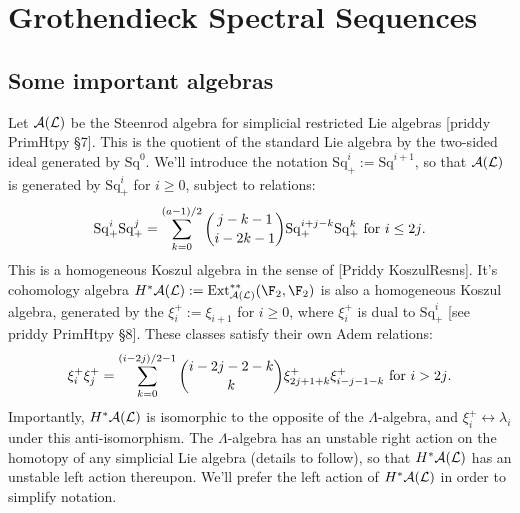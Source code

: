 \documentclass[11pt]{article}
\newcommand{\LambdaOp}{\xi^{+}}
\newcommand{\SqShift}{\Sq_{+}}
\newcommand{\Sq}{\mathrm{Sq}}
\newcommand{\LieSteen}{\calA(\calL)}
\begin{document}
\section*{Grothendieck Spectral Sequences}
\subsection*{Some important algebras}
Let  $\LieSteen$ be the Steenrod algebra for simplicial restricted Lie algebras [priddy PrimHtpy \S7]. This is the quotient of the standard Lie algebra by the two-sided ideal generated by $\Sq^0$. We'll introduce the notation $\SqShift^i:=\Sq^{i+1}$, so that $\LieSteen$ is generated by $\SqShift^i$ for $i\geq0$, subject to relations:
\[\SqShift^i\SqShift^j=\sum_{k=0}^{(a-1)/2}{j-k-1\choose i-2k-1}\SqShift^{i+j-k}\SqShift^k\textup{\ for $i\leq2j$.}\]
This is a homogeneous Koszul algebra in the sense of [Priddy KoszulResns]. It's cohomology algebra $H^*\LieSteen:=\Ext_{\LieSteen}^{**}(\F_2,\F_2)$ is also a homogeneous Koszul algebra, generated by the $\LambdaOp_i:=\xi_{i+1}$ for $i\geq0$, where $\LambdaOp_i$ is dual to $\SqShift^i$ [see priddy PrimHtpy \S8]. These classes satisfy their own Adem relations:
\[\LambdaOp_i\LambdaOp_j=\sum_{k=0}^{(i-2j)/2-1}{i-2j-2-k\choose k}\LambdaOp_{2j+1+k}\LambdaOp_{i-j-1-k}\textup{\ for $i>2j$.}\]
Importantly, $H^*\LieSteen$ is isomorphic to the opposite of the $\Lambda$-algebra, and $\LambdaOp_i\longleftrightarrow\lambda_i$ under this anti-isomorphism. The $\Lambda$-algebra has an unstable right action on the homotopy of any simplicial Lie algebra (details to follow), so that $H^*\LieSteen$ has an unstable left action thereupon. We'll prefer the left action of $H^*\LieSteen$ in order to simplify notation.
\end{document}
